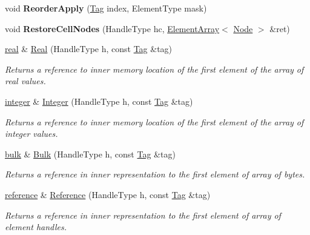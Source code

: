 \begin{DoxyCompactItemize}
\item 
\hypertarget{classINMOST_1_1Mesh_acc1b5232061e8f615d962c55dc5397c6}{void {\bfseries Reorder\-Apply} (\hyperlink{classINMOST_1_1Tag}{Tag} index, Element\-Type mask)}\label{classINMOST_1_1Mesh_acc1b5232061e8f615d962c55dc5397c6}

\item 
\hypertarget{classINMOST_1_1Mesh_a73e1126542b6778477ec51bf61dd35d1}{void {\bfseries Restore\-Cell\-Nodes} (Handle\-Type hc, \hyperlink{classINMOST_1_1ElementArray}{Element\-Array}$<$ \hyperlink{classINMOST_1_1Node}{Node} $>$ \&ret)}\label{classINMOST_1_1Mesh_a73e1126542b6778477ec51bf61dd35d1}

\item 
\hyperlink{classINMOST_1_1Storage_a853346784b4a5822a7fac54d8f10f805}{real} \& \hyperlink{classINMOST_1_1Mesh_afa084c637bc9f6850ed77fbb7778d404}{Real} (Handle\-Type h, const \hyperlink{classINMOST_1_1Tag}{Tag} \&tag)
\begin{DoxyCompactList}\small\item\em Returns a reference to inner memory location of the first element of the array of real values. \end{DoxyCompactList}\item 
\hyperlink{classINMOST_1_1Storage_aec96942bc647417a801e2895b45964d2}{integer} \& \hyperlink{classINMOST_1_1Mesh_aa9d44832b3e826a2b61c8e91c5457fbf}{Integer} (Handle\-Type h, const \hyperlink{classINMOST_1_1Tag}{Tag} \&tag)
\begin{DoxyCompactList}\small\item\em Returns a reference to inner memory location of the first element of the array of integer values. \end{DoxyCompactList}\item 
\hyperlink{classINMOST_1_1Storage_ae429556af77094077d212e0ac23c8cfc}{bulk} \& \hyperlink{classINMOST_1_1Mesh_a9df5a8793e5cd8e38182de107d381d9e}{Bulk} (Handle\-Type h, const \hyperlink{classINMOST_1_1Tag}{Tag} \&tag)
\begin{DoxyCompactList}\small\item\em Returns a reference in inner representation to the first element of array of bytes. \end{DoxyCompactList}\item 
\hyperlink{classINMOST_1_1Storage_a8674802045ec170a3c9d0e3281545b54}{reference} \& \hyperlink{classINMOST_1_1Mesh_acfa8b2f65d63edbbed90d865ab6f5314}{Reference} (Handle\-Type h, const \hyperlink{classINMOST_1_1Tag}{Tag} \&tag)
\begin{DoxyCompactList}\small\item\em Returns a reference in inner representation to the first element of array of element handles. \end{DoxyCompactList}\item 

\end{DoxyCompactItemize}
